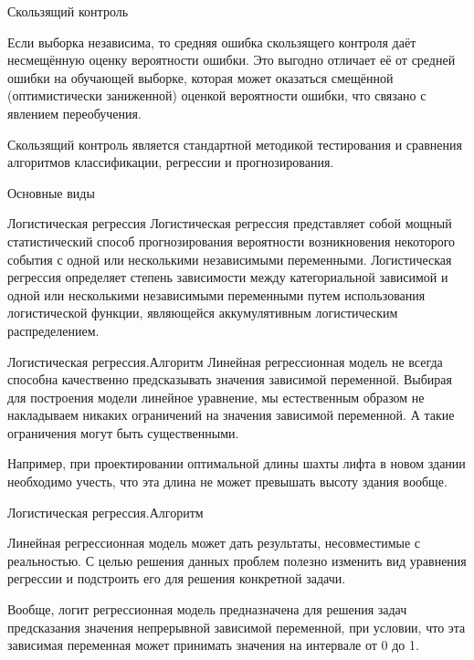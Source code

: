 \documentclass{beamer}
\begin{document}
\begin{frame}{Скользящий контроль}

Если выборка независима, то средняя ошибка скользящего контроля даёт несмещённую оценку вероятности ошибки. 
Это выгодно отличает её от средней ошибки на обучающей выборке, которая может оказаться смещённой 
(оптимистически заниженной) оценкой вероятности ошибки, что связано с явлением переобучения.

Скользящий контроль является стандартной методикой тестирования и сравнения алгоритмов классификации, регрессии и прогнозирования. 

\end{frame}


\begin{frame}{Основные виды}

\end{frame}




\begin{frame}{Логистическая регрессия}
Логистическая регрессия представляет собой мощный статистический способ прогнозирования вероятности возникновения 
некоторого события с одной или несколькими независимыми переменными.
 Логистическая регрессия определяет степень зависимости между категориальной зависимой и одной или несколькими 
 независимыми переменными путем использования логистической функции, являющейся аккумулятивным логистическим распределением. 

\end{frame}




\begin{frame}{Логистическая регрессия.Алгоритм}
Линейная регрессионная модель не всегда способна качественно предсказывать значения зависимой переменной. Выбирая для построения модели линейное уравнение, мы естественным 
образом не накладываем никаких ограничений на значения зависимой переменной. А такие ограничения могут быть существенными.

Например, при проектировании оптимальной длины шахты лифта в новом здании необходимо учесть, что эта длина не может превышать высоту здания вообще.
\end{frame}


\begin{frame}{Логистическая регрессия.Алгоритм}

Линейная регрессионная модель может дать результаты, несовместимые с реальностью. С целью решения данных проблем полезно изменить 
вид уравнения регрессии и подстроить его для решения конкретной задачи.

Вообще, логит регрессионная модель предназначена для решения задач предсказания 
значения непрерывной зависимой переменной, при условии, что эта зависимая переменная 
может принимать значения на интервале от 0 до 1.
\end{frame}
\end{document}
